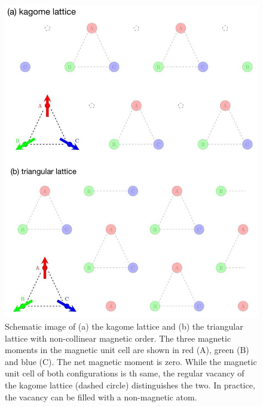 \documentclass[prb,showpacs,amsmath,amssymb,superscriptaddress,twocolumn,floatfix]{revtex4-1}
\begin{document}
\begin{figure}
	\centering
	\includegraphics[width=1\linewidth]{img/kagome_triangular_11.jpg}
	\caption{Schematic image of (a) the kagome lattice and (b) the triangular lattice with non-collinear magnetic order. The three magnetic moments in the magnetic unit cell are shown in red (A), green (B) and blue (C). The net magnetic moment is zero. While the magnetic unit cell of both configurations is th same, the regular vacancy of the kagome lattice (dashed circle) distinguishes the two. In practice, the vacancy can be filled with a non-magnetic atom.}
	\label{fig:kagome_triangular}
\end{figure}
\end{document}
